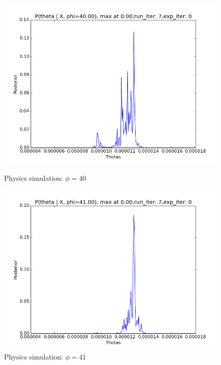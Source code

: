 \documentclass[10pt,journal,compsoc]{IEEEtran}
\begin{document}
\begin{figure}[ht!]
\begin{minipage}[b]{0.5\linewidth}
\centering
\includegraphics[width=1\linewidth]{PhysicsPlots/LP0.png} 
\caption{\label{fig:LP0} Physics simulation: $\phi=40$} 
\end{minipage}%
\begin{minipage}[b]{0.5\linewidth}
\centering
\includegraphics[width=1\linewidth]{PhysicsPlots/LP1.png} 
\caption{\label{fig:LP1}Physics simulation: $\phi=41$}
\end{minipage} 
\begin{minipage}[b]{0.5\linewidth}

\end{minipage}
\end{figure}
\end{document}
